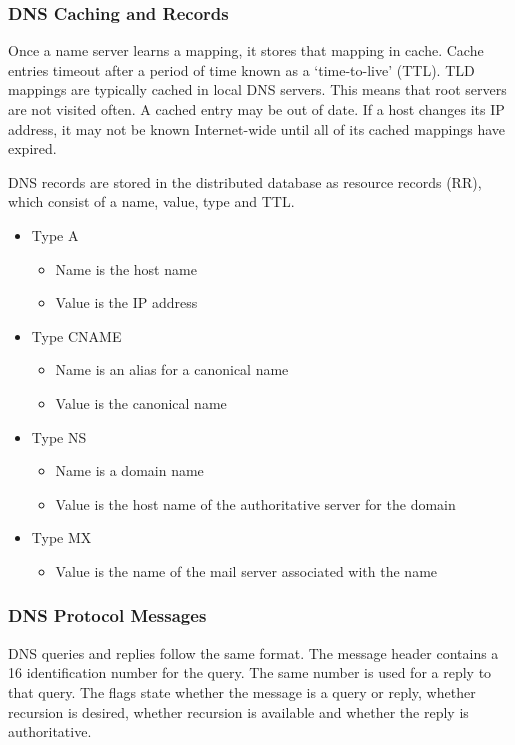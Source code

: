 \subsubsection{DNS Caching and Records}

Once a name server learns a mapping, it stores that mapping in cache.
Cache entries timeout after a period of time known as a `time-to-live' (TTL).
TLD mappings are typically cached in local DNS servers.
This means that root servers are not visited often.
A cached entry may be out of date.
If a host changes its IP address, it may not be known Internet-wide until all of its cached mappings have expired.

DNS records are stored in the distributed database as resource records (RR), which consist of a name, value, type and TTL\@.
\begin{itemize}
  \item Type A
  \begin{itemize}
    \item Name is the host name
    \item Value is the IP address
  \end{itemize}
  \item Type CNAME
  \begin{itemize}
    \item Name is an alias for a canonical name
    \item Value is the canonical name
  \end{itemize}
  \item Type NS
  \begin{itemize}
    \item Name is a domain name
    \item Value is the host name of the authoritative server for the domain
  \end{itemize}
  \item Type MX
  \begin{itemize}
    \item Value is the name of the mail server associated with the name
  \end{itemize}
\end{itemize}

\subsubsection{DNS Protocol Messages}

DNS queries and replies follow the same format.
The message header contains a \SI{16}{\bit} identification number for the query.
The same number is used for a reply to that query.
The flags state whether the message is a query or reply, whether recursion is desired, whether recursion is available and whether the reply is authoritative.

